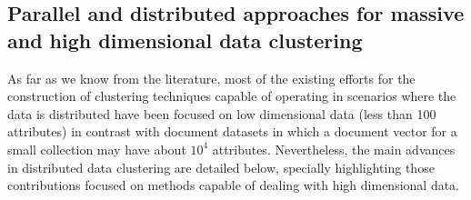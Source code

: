 \documentclass[10pt]{article}
\begin{document}
\subsection{Parallel and distributed approaches for massive and high dimensional data clustering}
As far as we know from the literature, most of the existing efforts for the construction of clustering techniques capable of operating in scenarios where the data is distributed have been focused on low dimensional data (less than 100 attributes) in contrast with document datasets in which a document vector for a small collection may have about $10^4$ attributes. Nevertheless, the main advances in distributed data clustering are detailed below, specially highlighting those contributions focused on methods capable of dealing with high dimensional data.
\end{document}
